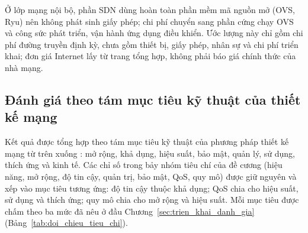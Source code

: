 Ở lớp mạng nội bộ, phần SDN dùng hoàn toàn phần mềm mã nguồn mở (OVS, Ryu) nên không phát sinh giấy phép; chi phí chuyển sang phần cứng chạy OVS và công sức phát triển, vận hành ứng dụng điều khiển. Ước lượng này chỉ gồm chi phí đường truyền định kỳ, chưa gồm thiết bị, giấy phép, nhân sự và chi phí triển khai; đơn giá Internet lấy từ trang tổng hợp, không phải báo giá chính thức của nhà mạng.

\subsection{Đánh giá theo tám mục tiêu kỹ thuật của thiết kế mạng}

Kết quả được tổng hợp theo tám mục tiêu kỹ thuật của phương pháp thiết kế mạng từ trên xuống \citep{oppenheimer2011topdown}: mở rộng, khả dụng, hiệu suất, bảo mật, quản lý, sử dụng, thích ứng và kinh tế. Các chỉ số trong bảy nhóm tiêu chí của đề cương (hiệu năng, mở rộng, độ tin cậy, quản trị, bảo mật, QoS, quy mô) được giữ nguyên và xếp vào mục tiêu tương ứng: độ tin cậy thuộc khả dụng; QoS chia cho hiệu suất, sử dụng và thích ứng; quy mô chia cho mở rộng và hiệu suất. Mỗi mục tiêu được chấm theo ba mức đã nêu ở đầu Chương~\ref{sec:trien_khai_danh_gia} (Bảng~\ref{tab:doi_chieu_tieu_chi}).

